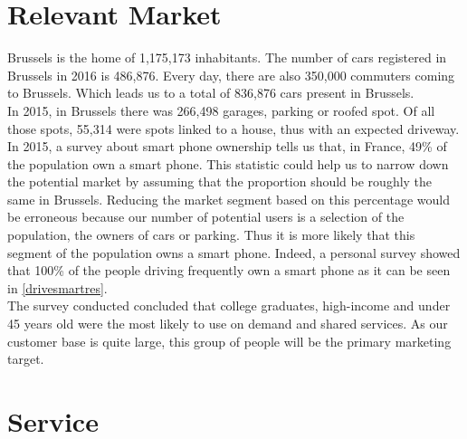 \documentclass[12pt,a4paper,oneside]{book}
\begin{document}
\section{Relevant Market}
\label{rmar}
Brussels is the home of 1,175,173 inhabitants.\cite{ciafb} The number of cars registered in Brussels in 2016 is 486,876.\cite{mtvr} Every day, there are also 350,000 commuters coming to Brussels.\cite{bxcommu} Which leads us to a total of 836,876 cars present in Brussels.\\

In 2015, in Brussels there was 266,498 garages, parking or roofed spot. Of all those spots, 55,314 were spots linked to a house, thus with an expected driveway.\cite{atpb}\\

In 2015, a survey about smart phone ownership tells us that, in France, 49\% of the population own a smart phone.\cite{spown} This statistic could help us to narrow down the potential market by assuming that the proportion should be roughly the same in Brussels. Reducing the market segment based on this percentage would be erroneous because our number of potential users is a selection of the population, the owners of cars or parking. Thus it is more likely that this segment of the population owns a smart phone. Indeed, a personal survey showed that 100\% of the people driving frequently own a smart phone as it can be seen in \autoref{drivesmartres}.\\

The survey conducted concluded that college graduates, high-income and under 45 years old were the most likely to use on demand and shared services.\cite{airbnbuse} As our customer base is quite large, this group of people will be the primary marketing target.

\section{Service}
\end{document}
